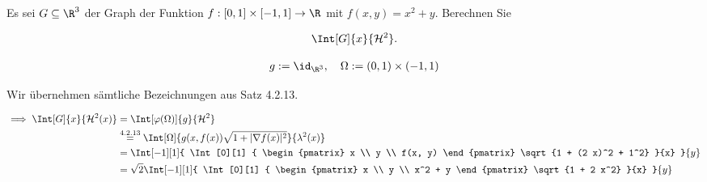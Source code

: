 
\begin{exercise}

Es sei $G \subseteq \R^3$ der Graph der Funktion $f: [0, 1] \times [-1, 1] \to \R$ mit $f(x, y) = x^2 + y$.
Berechnen Sie

\begin{align*}
    \Int[G]{x}{\mathcal{H}^2}.
\end{align*}

\end{exercise}


\begin{solution}

\begin{align*}
    g := \id_{\R^3},
    \quad
    \Omega := (0, 1) \times (-1, 1)
\end{align*}


Wir übernehmen sämtliche Bezeichnungen aus Satz 4.2.13.

\begin{align*}
    \implies
    \Int[G]{x}{\mathcal{H}^2(x)}
    & =
    \Int[\varphi(\Omega)]{g}{\mathcal{H}^2} \\
    & \stackrel
    {
        \mathrm{4.2.13}
    }{=}
    \Int[\Omega]
    {
        g(x, f(x))
        \sqrt{1 + |\nabla f(x)|^2}
    }{\lambda^2(x)} \\
    & =
    \Int[-1][1]
    {
        \Int[0][1]
        {
            \begin{pmatrix}
                x \\ y \\ f(x, y)
            \end{pmatrix}
            \sqrt{1 + (2 x)^2 + 1^2}
        }{x}
    }{y} \\
    & =
    \sqrt 2
    \Int[-1][1]
    {
        \Int[0][1]
        {
            \begin{pmatrix}
                x \\ y \\ x^2 + y
            \end{pmatrix}
            \sqrt{1 + 2 x^2}
        }{x}
    }{y}
\end{align*}

\begin{enumerate}[label = \arabic*.]


\end{enumerate}
\end{solution}
